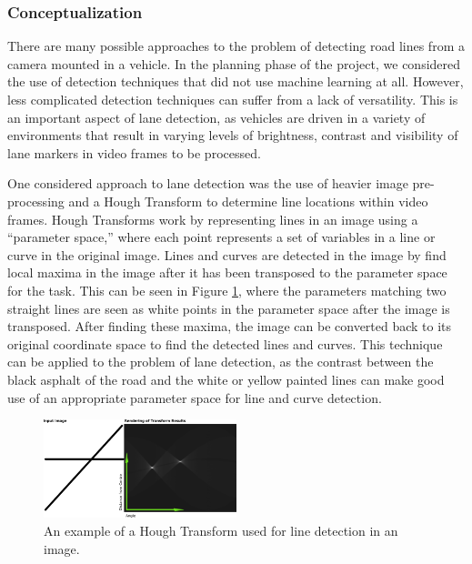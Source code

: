 \documentclass[titlepage]{article}
\begin{document}
\subsubsection{Conceptualization}

There are many possible approaches to the problem of detecting road lines from a camera mounted in a vehicle.
In the planning phase of the project, we considered the use of detection techniques that did not use machine learning at all.
However, less complicated detection techniques can suffer from a lack of versatility.
This is an important aspect of lane detection, as vehicles are driven in a variety of environments that result in varying
levels of brightness, contrast and visibility of lane markers in video frames to be processed.

One considered approach to lane detection was the use of heavier image pre-processing and a Hough Transform to determine line
locations within video frames.
Hough Transforms work by representing lines in an image using a ``parameter space,'' where each point represents a set of
variables in a line or curve in the original image.
Lines and curves are detected in the image by find local maxima in the image after it has been transposed to the parameter space
for the task.
This can be seen in Figure \ref{HoughTransform}, where the parameters matching two straight lines are seen as white points in
the parameter space after the image is transposed.
After finding these maxima, the image can be converted back to its original coordinate space to find the detected lines and
curves.
This technique can be applied to the problem of lane detection, as the contrast between the black asphalt of the road and the
white or yellow painted lines can make good use of an appropriate parameter space for line and curve detection.

\begin{figure}
	\centering
	\includegraphics[width=0.5\textwidth]{Hough-example}
	\caption{An example of a Hough Transform used for line detection in an image.}
	\label{HoughTransform}
\end{figure}
\end{document}
